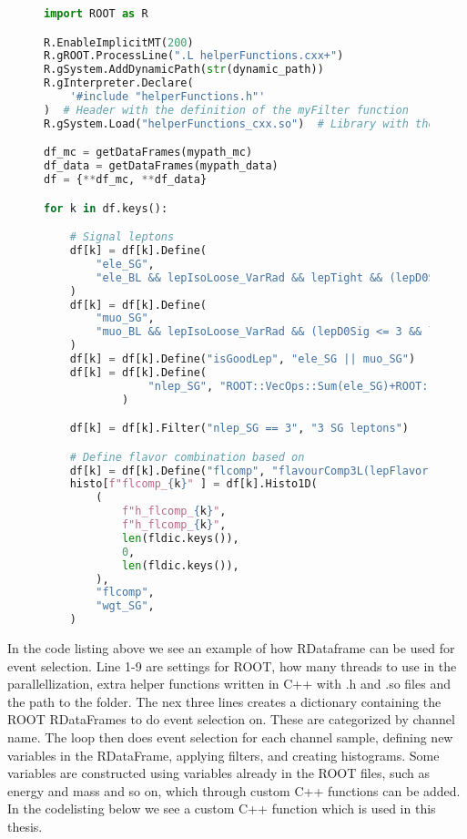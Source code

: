 \begin{figure}[H]
    \centering
\begin{lstlisting}[language=Python, style=pythonstyle, label={code:python_func_example}]
import ROOT as R

R.EnableImplicitMT(200)
R.gROOT.ProcessLine(".L helperFunctions.cxx+")
R.gSystem.AddDynamicPath(str(dynamic_path))
R.gInterpreter.Declare(
    '#include "helperFunctions.h"'
)  # Header with the definition of the myFilter function
R.gSystem.Load("helperFunctions_cxx.so")  # Library with the myFilter function

df_mc = getDataFrames(mypath_mc)
df_data = getDataFrames(mypath_data)
df = {**df_mc, **df_data}

for k in df.keys():

    # Signal leptons
    df[k] = df[k].Define(
        "ele_SG",
        "ele_BL && lepIsoLoose_VarRad && lepTight && (lepD0Sig <= 5 && lepD0Sig >= -5)",
    )  
    df[k] = df[k].Define(
        "muo_SG",
        "muo_BL && lepIsoLoose_VarRad && (lepD0Sig <= 3 && lepD0Sig >= -3)",
    )  
    df[k] = df[k].Define("isGoodLep", "ele_SG || muo_SG")
    df[k] = df[k].Define(
                "nlep_SG", "ROOT::VecOps::Sum(ele_SG)+ROOT::VecOps::Sum(muo_SG)"
            )

    df[k] = df[k].Filter("nlep_SG == 3", "3 SG leptons")

    # Define flavor combination based on 
    df[k] = df[k].Define("flcomp", "flavourComp3L(lepFlavor[ele_SG || muo_SG])")
    histo[f"flcomp_{k}" ] = df[k].Histo1D(
        (
            f"h_flcomp_{k}",
            f"h_flcomp_{k}",
            len(fldic.keys()),
            0,
            len(fldic.keys()),
        ),
        "flcomp",
        "wgt_SG",
    )
    \end{lstlisting}
\end{figure}

In the code listing above we see an example of how RDataframe can be used for event selection. Line 1-9 are settings for ROOT, 
how many threads to use in the parallellization, extra helper functions written in C++ with .h and .so files and the path to the folder.
The nex three lines creates a dictionary containing the ROOT RDataFrames to do event selection on. These are categorized by channel name. 
The loop then does event selection for each channel sample, defining new variables in the RDataFrame, applying filters, and creating histograms.
Some variables are constructed using variables already in the ROOT files, such as energy and mass and so on, which through custom C++ functions
can be added. In the codelisting below we see a custom C++ function which is used in this thesis.

